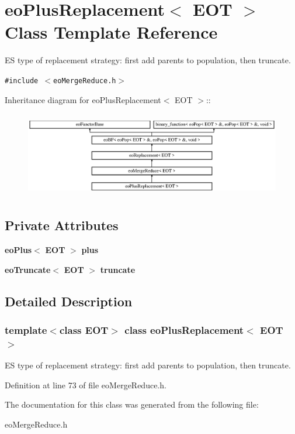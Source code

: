 \section{eo\-Plus\-Replacement$<$ EOT $>$ Class Template Reference}
\label{classeo_plus_replacement}
ES type of replacement strategy: first add parents to population, then truncate.  


{\tt \#include $<$eo\-Merge\-Reduce.h$>$}

Inheritance diagram for eo\-Plus\-Replacement$<$ EOT $>$::\begin{figure}[H]
\begin{center}
\leavevmode
\includegraphics[height=3.76344cm]{classeo_plus_replacement}
\end{center}
\end{figure}
\subsection*{Private Attributes}
\begin{CompactItemize}
\item 
{\bf eo\-Plus}$<$ {\bf EOT} $>$ {\bf plus}\label{classeo_plus_replacement_r0}

\item 
{\bf eo\-Truncate}$<$ {\bf EOT} $>$ {\bf truncate}\label{classeo_plus_replacement_r1}

\end{CompactItemize}


\subsection{Detailed Description}
\subsubsection*{template$<$class EOT$>$ class eo\-Plus\-Replacement$<$ EOT $>$}

ES type of replacement strategy: first add parents to population, then truncate. 



Definition at line 73 of file eo\-Merge\-Reduce.h.

The documentation for this class was generated from the following file:\begin{CompactItemize}
\item 
eo\-Merge\-Reduce.h\end{CompactItemize}
